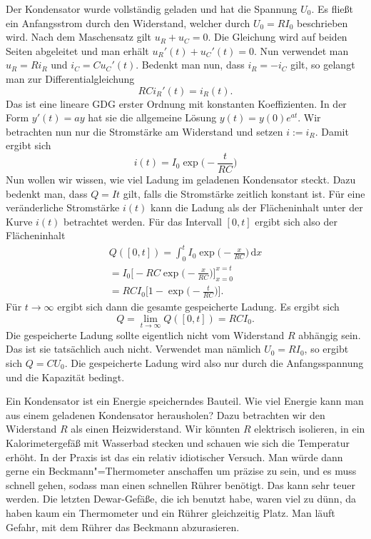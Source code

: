 \documentclass[a4paper,10pt,fleqn,twocolumn,twoside]{scrartcl}
\numberwithin{equation}{section}
\begin{document}
\noindent
Der Kondensator wurde vollständig geladen und hat die Spannung
$U_0$. Es fließt ein Anfangsstrom durch den Widerstand, welcher
durch $U_0=RI_0$ beschrieben wird. Nach dem Maschensatz
gilt $u_R+u_C=0$.
Die Gleichung wird auf beiden Seiten abgeleitet und man erhält
$u_R'(t)+u_C'(t)=0$. Nun verwendet man $u_R=Ri_R$ und $i_C=Cu_C'(t)$.
Bedenkt man nun, dass $i_R=-i_C$ gilt, so gelangt man zur
Differentialgleichung%
\begin{equation}
RCi_R'(t) = i_R(t).
\end{equation}
Das ist eine lineare GDG erster Ordnung mit konstanten Koeffizienten.
In der Form $y'(t)=ay$ hat sie die allgemeine Lösung
$y(t)=y(0)e^{at}$. Wir betrachten nun nur die Stromstärke am
Widerstand und setzen $i:=i_R$. Damit ergibt sich%
\begin{equation}\label{RCStrom}
i(t) = I_0\exp\Big(-\frac{t}{RC}\Big)
\end{equation}
Nun wollen wir wissen, wie viel Ladung im geladenen Kondensator
steckt. Dazu bedenkt man, dass $Q=It$ gilt, falls die Stromstärke
zeitlich konstant ist. Für eine veränderliche Stromstärke $i(t)$
kann die Ladung als der Flächeninhalt unter der Kurve $i(t)$
betrachtet werden. Für das Intervall $[0,t]$ ergibt sich also
der Flächeninhalt%
\begin{gather*}
Q([0,t]) = \int_0^t I_0 \exp\Big(-\frac{x}{RC}\Big)\,\mathrm dx\\
= I_0\Big[-RC\exp\Big(-\frac{x}{RC}\Big)\Big]_{x=0}^{x=t}\\
= RC I_0 \Big[1-\exp\Big(-\frac{t}{RC}\Big)\Big].
\end{gather*}
Für $t\rightarrow\infty$ ergibt sich dann die gesamte gespeicherte
Ladung. Es ergibt sich%
\begin{equation}
Q = \lim_{t\rightarrow\infty}Q([0,t]) = RCI_0.
\end{equation}
Die gespeicherte Ladung sollte eigentlich nicht vom Widerstand
$R$ abhängig sein. Das ist sie tatsächlich auch nicht. Verwendet
man nämlich $U_0=RI_0$, so ergibt sich $Q=CU_0$. Die gespeicherte
Ladung wird also nur durch die Anfangsspannung und die Kapazität
bedingt.

Ein Kondensator ist ein Energie speicherndes Bauteil. Wie viel
Energie kann man aus einem geladenen Kondensator herausholen?
Dazu betrachten wir den Widerstand $R$ als einen Heizwiderstand.
Wir könnten $R$ elektrisch isolieren, in ein Kalorimetergefäß
mit Wasserbad stecken und schauen wie sich die Temperatur erhöht.
In der Praxis ist das ein relativ idiotischer Versuch. Man würde
dann gerne ein Beckmann"=Thermometer anschaffen um präzise zu sein,
und es muss schnell gehen, sodass man einen schnellen Rührer
benötigt. Das kann sehr teuer werden. Die letzten Dewar-Gefäße,
die ich benutzt habe, waren viel zu dünn, da haben kaum ein
Thermometer und ein Rührer gleichzeitig Platz. Man läuft Gefahr,
mit dem Rührer das Beckmann abzurasieren. 
\end{document}
